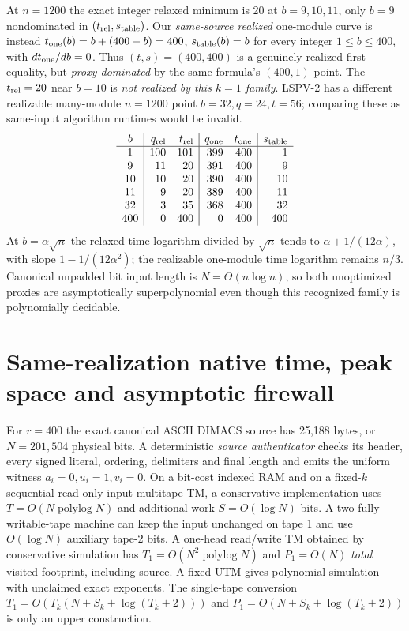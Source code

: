 \documentclass[11pt]{article}
\begin{document}
At $n=1200$ the exact integer relaxed minimum is 20 at $b=9,10,11$, only $b=9$ nondominated in $(t_{\rm rel},s_{\rm table})$. Our \emph{same-source realized} one-module curve is instead $t_{\rm one}(b)=b+(400-b)=400$, $s_{\rm table}(b)=b$ for every integer $1\le b\le400$, with $dt_{\rm one}/db=0$. Thus $(t,s)=(400,400)$ is a genuinely realized first equality, but \emph{proxy dominated} by the same formula's $(400,1)$ point. The $t_{\rm rel}=20$ near $b=10$ is \emph{not realized by this $k=1$ family}. LSPV-2 has a different realizable many-module $n=1200$ point $b=32,q=24,t=56$; comparing these as same-input algorithm runtimes would be invalid.
\[
\begin{array}{c|rr|rr|r}
b&q_{\rm rel}&t_{\rm rel}&q_{\rm one}&t_{\rm one}&s_{\rm table}\\\hline
1&100&101&399&400&1\\
9&11&20&391&400&9\\
10&10&20&390&400&10\\
11&9&20&389&400&11\\
32&3&35&368&400&32\\
400&0&400&0&400&400
\end{array}
\]
At $b=\alpha\sqrt{n}$ the relaxed time logarithm divided by $\sqrt n$ tends to $\alpha+1/(12\alpha)$, with slope $1-1/(12\alpha^2)$; the realizable one-module time logarithm remains $n/3$. Canonical unpadded bit input length is $N=\Theta(n\log n)$, so both unoptimized proxies are asymptotically superpolynomial even though this recognized family is polynomially decidable.

\section{Same-realization native time, peak space and asymptotic firewall}
For $r=400$ the exact canonical ASCII DIMACS source has 25,188 bytes, or $N=201,504$ physical bits. A deterministic \emph{source authenticator} checks its header, every signed literal, ordering, delimiters and final length and emits the uniform witness $a_i=0,u_i=1,v_i=0$. On a bit-cost indexed RAM and on a fixed-$k$ sequential read-only-input multitape TM, a conservative implementation uses $T=O(N\operatorname{polylog}N)$ and additional work $S=O(\log N)$ bits. A two-fully-writable-tape machine can keep the input unchanged on tape 1 and use $O(\log N)$ auxiliary tape-2 bits. A one-head read/write TM obtained by conservative simulation has $T_1=O(N^2\operatorname{polylog}N)$ and $P_1=O(N)$ \emph{total} visited footprint, including source. A fixed UTM gives polynomial simulation with unclaimed exact exponents. The single-tape conversion $T_1=O(T_k(N+S_k+\log(T_k+2)))$ and $P_1=O(N+S_k+\log(T_k+2))$ is only an upper construction.
\end{document}

